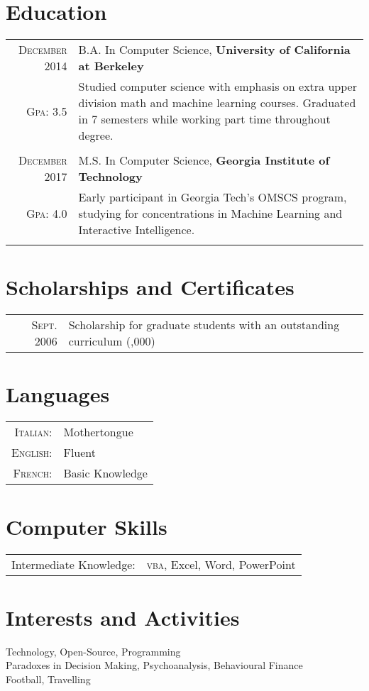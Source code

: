 \documentclass[a4paper,10pt]{article}
\begin{document}
\section{Education}
\begin{tabular}{rp{11cm}}
 \textsc{December} 2014 & B.A. In Computer Science, \textbf{University of California at Berkeley}\\
 \textsc{Gpa}: 3.5 &
 \footnotesize{
	 Studied computer science with emphasis on extra upper
	 division math and machine learning courses.
	 Graduated in 7 semesters while working part time throughout degree.
}
	 \\\multicolumn{2}{c}{} \\

	\textsc{December} 2017 & M.S. In Computer Science, \textbf{Georgia Institute of Technology}\\
	\textsc{Gpa}: 4.0 &
	\footnotesize{
Early participant in Georgia Tech's OMSCS program, studying for concentrations
in Machine Learning and Interactive Intelligence.
 }
		\\\multicolumn{2}{c}{} \\

\end{tabular}

\section{Scholarships and Certificates}
\begin{tabular}{rl}
 \textsc{Sept.} 2006 & Scholarship for graduate students with an outstanding curriculum \footnotesize(\EURcr 30,000)\normalsize\\
\end{tabular}

\section{Languages}
\begin{tabular}{rl}
 \textsc{Italian:}&Mothertongue\\
\textsc{English:}&Fluent\\
\textsc{French:}&Basic Knowledge\\
\end{tabular}

\section{Computer Skills}
\begin{tabular}{rl}
Intermediate Knowledge:& \textsc{vba}, Excel, Word, PowerPoint
\end{tabular}

\section{Interests and Activities}
Technology, Open-Source, Programming\\
Paradoxes in Decision Making, Psychoanalysis, Behavioural Finance\\
Football, Travelling


\end{document}
